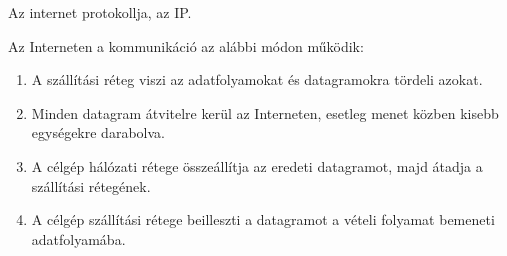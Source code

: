 \documentclass[margin=0px]{article}
\begin{document}
\begin{description}
				Az internet protokollja, az IP.
				
				Az Interneten a kommunikáció az alábbi módon működik:
				\begin{enumerate}
					\item A szállítási réteg viszi az adatfolyamokat és datagramokra tördeli azokat.
					\item Minden datagram átvitelre kerül az Interneten, esetleg menet közben kisebb egységekre darabolva.
					\item A célgép hálózati rétege összeállítja az eredeti datagramot, majd átadja a szállítási rétegének.
					\item A célgép szállítási rétege beilleszti a datagramot a vételi folyamat bemeneti adatfolyamába.
				\end{enumerate}
				

\end{description}
\end{document}

